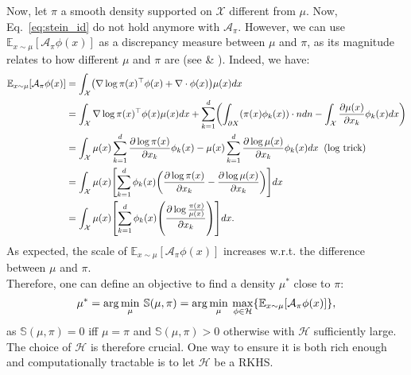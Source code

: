 \documentclass[runningheads,a4paper]{llncs}
\newcommand{\E}{\mathbb{E}}
\newcommand{\Sr}{\mathbb{S}}
\newcommand{\X}{\mathcal{X}}
\newcommand{\A}{\mathcal{A}}
\newcommand{\Hr}{\mathcal{H}}
\newcommand{\diff}[2]{\frac{\partial #1}{\partial #2}}
\DeclarePairedDelimiter{\pare}{(}{)}
\DeclarePairedDelimiter{\bra}{\{}{\}}
\DeclarePairedDelimiter{\sq}{[}{]}
\begin{document}
Now, let $\pi$ a smooth density supported on $\X$ different from $\mu$. Now, Eq.~\ref{eq:stein_id} do not hold
anymore with $\A_\pi$. However, we can use $\E_{x \sim \mu}[\A_\pi \phi (x)]$ as a discrepancy
measure between $\mu$ and $\pi$, as its magnitude relates to how different $\mu$ and $\pi$ are
(see \cite{https://doi.org/10.48550/arxiv.1608.04471} \& \cite{https://doi.org/10.48550/arxiv.1704.07520}).
Indeed, we have:
\begin{equation}
  \begin{split}
    \E_{x \sim \mu}[\A_\pi \phi (x)] &=
      \int_\X \pare*{ \nabla \log \pi(x)^\top \phi(x) + \nabla \cdot \phi(x) } \mu(x) dx \\
    &= \int_\X \nabla \log \pi(x)^\top \phi(x) \mu(x) dx +
    \sum_{k=1}^d \pare*{ \int_{\partial X}(\pi(x) \phi_k(x)) \cdot n dn - \int_\X \diff{\mu(x)}{x_k} \phi_k(x) dx} \\
    &= \int_\X  \mu(x) \sum_{k=1}^d \diff{\log \pi(x)}{x_k}\phi_k(x) -
    \mu(x) \sum_{k=1}^d \diff{\log \mu(x)}{x_k} \phi_k(x) dx \;\; \text{(log trick)} \\
    &= \int_\X  \mu(x) \sq*{ \sum_{k=1}^d \phi_k(x) \pare*{ \diff{\log \pi(x)}{x_k} - \diff{\log \mu(x)}{x_k}}} dx \\
    &= \int_\X  \mu(x) \sq*{ \sum_{k=1}^d \phi_k(x) \pare*{ \diff{\log \frac{\pi(x)}{\mu(x)}}{x_k}}} dx.
  \end{split}
\end{equation}
As expected, the scale of $\E_{x \sim \mu}[\A_\pi \phi (x)]$ increases w.r.t. the difference between $\mu$ and $\pi$.\\

Therefore, one can define an objective to find a density $\mu^*$ close to $\pi$:
\begin{equation}
  \mu^* = \arg\min_{\mu} \: \Sr(\mu, \pi) =
    \arg\min_{\mu} \: \max_{\phi \in \Hr} \bra*{ \E_{x \sim \mu}[\A_\pi \phi (x)] },
  \label{eq:stein_obj}
\end{equation}
as $\Sr(\mu, \pi) = 0$ iff $\mu = \pi$ and $\Sr(\mu, \pi) > 0$ otherwise with $\Hr$ sufficiently large.
The choice of $\Hr$ is therefore crucial. One way to ensure it is both rich enough and computationally tractable
is to let $\Hr$ be a RKHS.
\end{document}
